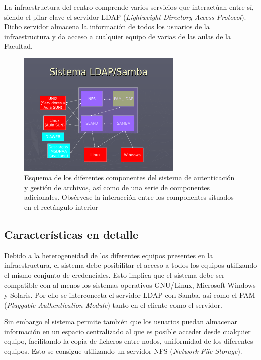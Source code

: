 La infraestructura del centro comprende varios servicios que interactúan entre sí, siendo el pilar clave el servidor LDAP (\textit{Lightweight Directory Access Protocol})\citationneeded. Dicho servidor almacena la información de todos los usuarios de la infraestructura y da acceso a cualquier equipo de varias de las aulas de la Facultad.
\begin{figure}[H]
	\centering
	\includegraphics[width=0.7\textwidth]{Chapter4/Figures/LDAP.pdf}
	\caption{Esquema de los diferentes componentes del sistema de autenticación y gestión de archivos, así como de una serie de componentes adicionales. Obsérvese la interacción entre los componentes situados en el rectángulo interior}
	\label{fig:arquitectura_ldap}
\end{figure}

\subsection{Características en detalle}

Debido a la heterogeneidad de los diferentes equipos presentes en la infraestructura, el sistema debe posibilitar el acceso a todos los equipos utilizando el mismo conjunto de credenciales. Esto implica que el sistema debe ser compatible con al menos los sistemas operativos GNU/Linux, Microsoft Windows y Solaris. Por ello se interconecta el servidor LDAP con Samba, así como el PAM (\textit{Pluggable Authentication Module}) tanto en el cliente como el servidor.

Sin embargo el sistema permite también que los usuarios puedan almacenar información en un espacio centralizado al que es posible acceder desde cualquier equipo, facilitando la copia de ficheros entre nodos, uniformidad de los diferentes equipos. Esto se consigue utilizando un servidor NFS (\textit{Network File Storage}).

